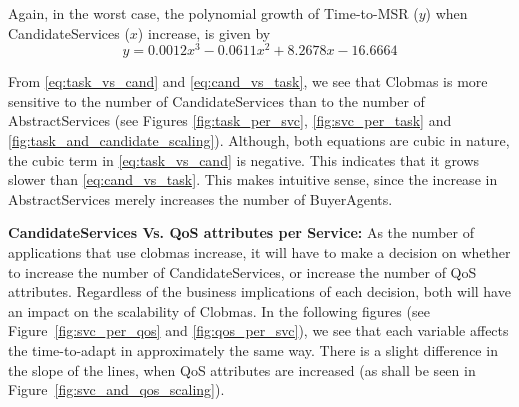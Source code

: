 \documentclass[10pt,journal,compsoc]{IEEEtran}
\begin{document}
Again, in the worst case, the polynomial growth of Time-to-MSR ($y$) when CandidateServices ($x$) increase, is given by
\begin{equation}
    y =  0.0012x^{3} - 0.0611x^{2} +  8.2678x - 16.6664 \label{eq:cand_vs_task}
\end{equation}

From \autoref{eq:task_vs_cand} and \autoref{eq:cand_vs_task}, we see that Clobmas is more sensitive to the number of CandidateServices than to the number of AbstractServices (see Figures \ref{fig:task_per_svc}, \ref{fig:svc_per_task} and \ref{fig:task_and_candidate_scaling}). Although, both equations are cubic in nature, the cubic term in \autoref{eq:task_vs_cand} is negative. This indicates that it grows slower than \autoref{eq:cand_vs_task}. This makes intuitive sense, since the increase in AbstractServices merely increases the number of BuyerAgents. 

\textbf{CandidateServices Vs. QoS attributes per Service:}
As the number of applications that use clobmas increase, it will have to make a decision on whether to increase the number of CandidateServices, or increase the number of QoS attributes. Regardless of the business implications of each decision, both will have an impact on the scalability of Clobmas. In the following figures (see Figure~\ref{fig:svc_per_qos} and \ref{fig:qos_per_svc}), we see that each variable affects the time-to-adapt in approximately the same way. There is a slight difference in the slope of the lines, when QoS attributes are increased (as shall be seen in Figure~\ref{fig:svc_and_qos_scaling}).
\end{document}
